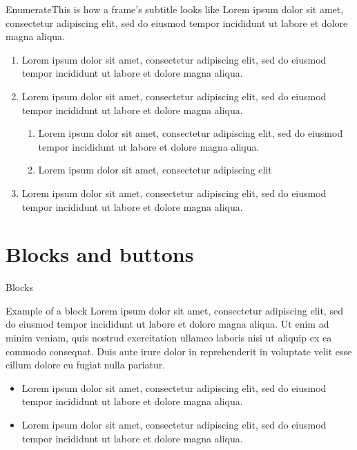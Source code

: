 \documentclass[10pt,numbering,toc]{bpslides}
\begin{document}
\begin{frame}{Enumerate}{This is how a frame's subtitle looks like}
    Lorem ipsum dolor sit amet, consectetur adipiscing elit, sed do eiusmod tempor incididunt ut labore et dolore magna aliqua. 
	\begin{enumerate}
	\item Lorem ipsum dolor sit amet, consectetur adipiscing elit, sed do eiusmod tempor incididunt ut labore et dolore magna aliqua.
	\item Lorem ipsum dolor sit amet, consectetur adipiscing elit, sed do eiusmod tempor incididunt ut labore et dolore magna aliqua. 
	\begin{enumerate}
	\item Lorem ipsum dolor sit amet, consectetur adipiscing elit, sed do eiusmod tempor incididunt ut labore et dolore magna aliqua. 
	\item Lorem ipsum dolor sit amet, consectetur adipiscing elit
	\end{enumerate}
	\item Lorem ipsum dolor sit amet, consectetur adipiscing elit, sed do eiusmod tempor incididunt ut labore et dolore magna aliqua. 
	\end{enumerate}
\end{frame}

\section{Blocks and buttons}

\begin{frame}{Blocks}
    \begin{block}{Example of a block}
    Lorem ipsum dolor sit amet, consectetur adipiscing elit, sed do eiusmod tempor incididunt ut labore et dolore magna aliqua. Ut enim ad minim veniam, quis nostrud exercitation ullamco laboris nisi ut aliquip ex ea commodo consequat. Duis aute irure dolor in reprehenderit in voluptate velit esse cillum dolore eu fugiat nulla pariatur.
    \end{block}
	\begin{itemize}
	\item Lorem ipsum dolor sit amet, consectetur adipiscing elit, sed do eiusmod tempor incididunt ut labore et dolore magna aliqua.
	\item Lorem ipsum dolor sit amet, consectetur adipiscing elit, sed do eiusmod tempor incididunt ut labore et dolore magna aliqua.
	\end{itemize}
\end{frame}
\end{document}
